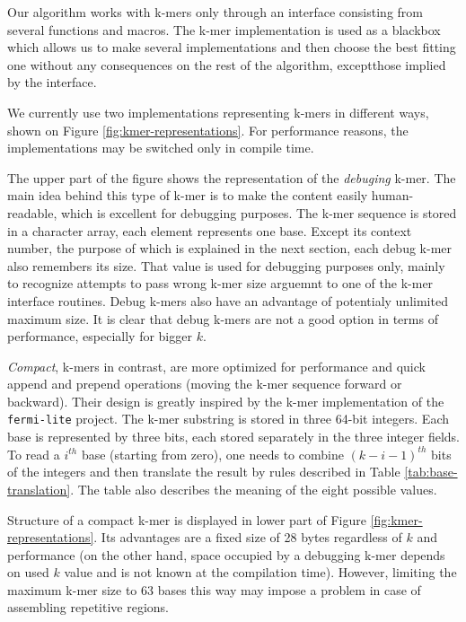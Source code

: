 Our algorithm works with k-mers only through an interface consisting from several functions and macros. The k-mer implementation is used as a blackbox which allows us to make several implementations and then choose the best fitting one without any consequences on the rest of the algorithm, exceptthose implied by the interface.

We currently use two implementations representing k-mers in different ways, shown on Figure \ref{fig:kmer-representations}. For performance reasons, the implementations may be switched only in compile time. 

The upper part of the figure shows the representation of the \textit{debuging} k-mer. The main idea behind this type of k-mer is to make the content easily human-readable, which is excellent for debugging purposes. The k-mer sequence is stored in a character array, each element represents one base. Except its context number, the purpose of which is explained in the next section, each debug k-mer also remembers its size. That value is used for debugging purposes only, mainly to recognize attempts to pass wrong k-mer size arguemnt to one of the k-mer interface routines. Debug k-mers also have an advantage of potentialy unlimited maximum size. It is clear that debug k-mers are not a good option in terms of performance, especially for bigger $k$.

\textit{Compact}, k-mers in contrast,  are more optimized for performance and quick append and prepend operations (moving the k-mer sequence forward or backward). Their design is greatly inspired by the k-mer implementation of the \texttt{fermi-lite} project. The k-mer substring is stored in three 64-bit integers. Each base is represented by three bits, each stored separately in  the three integer fields. To read a $i^{th}$ base (starting from zero), one needs to combine $(k-i-1)^{th}$ bits of the integers and then translate the result by rules described in Table \ref{tab:base-translation}. The table also describes the meaning of the eight possible values.

Structure of a compact k-mer is displayed in lower part of Figure \ref{fig:kmer-representations}. Its advantages are a fixed size of 28 bytes regardless of $k$ and performance (on the other hand, space occupied by a debugging k-mer depends on used $k$ value and is not known at the compilation time). However, limiting the maximum k-mer size to 63 bases this way may impose a problem in case of assembling repetitive regions.

